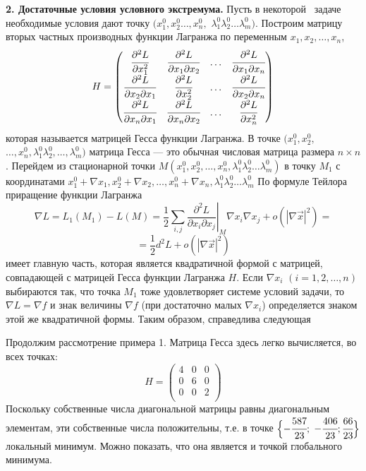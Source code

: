 \indent\textbf{2. Достаточные условия условного экстремума.} Пусть в некоторой~ задаче~ необходимые условия дают точку $(x_1^0,x_2^0\dots,x_n^0,$ $\lambda_1^0\lambda_2^0\dots\lambda_m^0)$. Построим матрицу вторых частных производных функции Лагранжа по переменным $x_1,x_2,\dots,x_n$,
$$$$
\[%
 H = \begin{pmatrix}
 \cfrac {\partial^2 L}{\partial x_1^2}&\cfrac {\partial^2 L}{\partial x_1 \partial x_2}&\dots&\cfrac {\partial^2 L}{\partial x_1 \partial x_n}\\
 \cfrac {\partial^2 L}{\partial x_2 \partial x_1} & \cfrac {\partial^2 L}{\partial x_2^2} & \dots&\cfrac {\partial^2 L}{\partial x_2 \partial x_n}\\
 \cfrac {\partial^2 L}{\partial x_n \partial x_1} & \cfrac {\partial^2 L}{\partial x_n \partial x_2} & \dots  &\cfrac {\partial^2 L}{\partial x_n^2} \\
\end{pmatrix}
\]
которая называется матрицей Гесса функции Лагранжа. В точке $(x_1^0,x_2^0,$ $\dots,x_n^0,\lambda_1^0\lambda_2^0,\dots,\lambda_m^0)$ матрица Гесса — это обычная числовая матрица размера $n \times n$. Перейдем из стационарной точки
$M(x_1^0,x_2^0,\dots, x_n^0,\lambda_1^0\lambda_2^0\dots\lambda_m^0)$ в точку $M_1$ с координатами $x_1^{0}+\nabla x_1,x_2^{0}+\nabla x_2,\dots,x_n^{0}+\nabla x_n,\lambda_1^0\lambda_2^0\dots\lambda_m^0$ По формуле Тейлора приращение функции Лагранжа
\[
  \nabla L = L_1(M_1) - L(M) = \frac {1}{2} \sum\limits_{i,j}\left.\frac {\partial^2 L}{\partial x_i \partial x_j}\right|_M  \nabla x_i  \nabla x_j + o(| \nabla \vec x|^2) =\]
\[
  =\frac {1}{2} d^2 L +  o(| \nabla \vec x|^2)
\]
имеет главную часть, которая является квадратичной формой с матрицей, совпадающей с матрицей Гесса функции Лагранжа $H$.
Если $\nabla x_i$ $(i = 1,2,\dots,n)$ выбираются так, что точка $M_1$ тоже удовлетворяет системе условий задачи, то $\nabla L =  \nabla f$ и знак величины $\nabla f$ (при достаточно малых $\nabla x_i$) определяется знаком этой же квадратичной
формы. Таким образом, справедлива следующая


Продолжим рассмотрение примера 1. Матрица Гесса здесь легко вычисляется, во всех точках:
$$
H = \begin{pmatrix}
4&0&0\\
0&6&0\\
0&0&2\\
\end{pmatrix}
$$
Поскольку собственные числа диагональной матрицы равны диагональным элементам, эти собственные числа положительны, т.е. в
точке $\Bigl\{ -\cfrac {587}{23};$ $ -\cfrac {406}{23}; \cfrac {66}{23}\Bigl\}$ локальный минимум. Можно показать, что она является и точкой глобального минимума.

